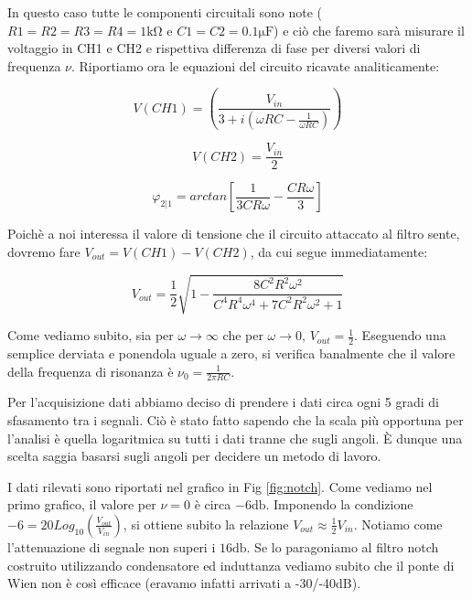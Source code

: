 In questo caso tutte le componenti circuitali sono note ($R1=R2=R3=R4=1 \si{\kilo\ohm}$ e $C1=C2=0.1 \si{\micro\farad}$) e ciò che faremo sarà misurare il voltaggio in CH1 e CH2 e rispettiva differenza di fase per diversi valori di frequenza $\nu$. Riportiamo ora le equazioni del circuito ricavate analiticamente: 

\noindent
\begin{minipage}{.65\linewidth}
\begin{equation}
V(CH1) = (\frac{V_{in}}{3+i(\omega R C - \frac{1}{\omega R C})})
\label{eq:V1}
\end{equation}
\end{minipage}%
\begin{minipage}{.5\linewidth}
\begin{equation}
V(CH2) = \frac{V_{in}}{2}
\label{eq:V(CH2)}
\end{equation}
\end{minipage}


\begin{equation}
\varphi_{2|1}=arctan[\frac{1}{3 C R \omega}-\frac{C R \omega}{3}]
\label{eq:F12}
\end{equation}


Poichè a noi interessa il valore di tensione che il circuito attaccato al filtro sente, dovremo fare $V_{out}=V(CH1)-V(CH2)$, da cui segue immediatamente:

\begin{equation}
V_{out}=\frac{1}{2} \sqrt{1-\frac{8 C^2 R^2 \omega^2}{C^4 R^4 \omega^4+7 C^2 R^2 \omega^2+1}}
\end{equation}



Come vediamo subito, sia per $\omega \rightarrow \infty$ che per $\omega \rightarrow 0$, $V_{out}=\frac{1}{2}$. Eseguendo una semplice derviata e ponendola uguale a zero, si verifica banalmente che il valore della frequenza di risonanza è $\nu_0=\frac{1}{2 \pi R C}$.

Per l'acquisizione dati abbiamo deciso di prendere i dati circa ogni 5 gradi di sfasamento tra i segnali. Ciò è stato fatto sapendo che la scala più opportuna per l'analisi è quella logaritmica su tutti i dati tranne che sugli angoli. \`E dunque una scelta saggia basarsi sugli angoli per decidere un metodo di lavoro.


I dati rilevati sono riportati nel grafico in Fig \ref{fig:notch}. Come vediamo nel primo grafico, il valore per $\nu=0$ è circa $-6 \si{\decibel}$. Imponendo la condizione $-6=20Log_{10}(\frac{V_{out}}{V_{in}})$, si ottiene subito la relazione $V_{out} \approx \frac{1}{2} V_{in}$. Notiamo come l'attenuazione di segnale non superi i $16 \si{\decibel}$. Se lo paragoniamo al filtro notch costruito utilizzando condensatore ed induttanza vediamo subito che il ponte di Wien non è così efficace (eravamo infatti arrivati a -30/-40dB). 

